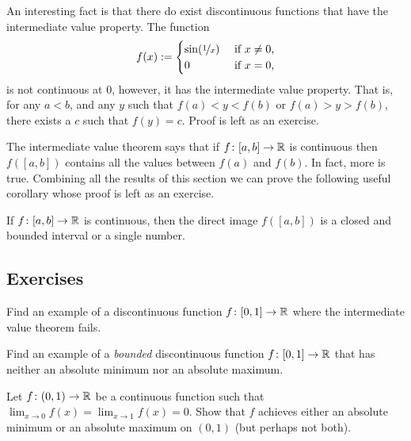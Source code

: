 \begin{example}
An interesting fact is that there do exist discontinuous functions that have
the intermediate value property.
The function
\begin{equation*}
f(x) :=
\begin{cases}
\sin(\nicefrac{1}{x}) & \text{ if $x \not= 0$,} \\
0 & \text{ if $x=0$,}
\end{cases}
\end{equation*}
is not continuous at 0, however, it has the intermediate value property.
That is, for any $a < b$, and any $y$ such that $f(a) < y < f(b)$
or $f(a) > y > f(b)$,
there exists a $c$ such that $f(y) = c$.
Proof is left as an exercise.
\end{example}

The intermediate value theorem says that if $f \colon [a,b] \to {\mathbb{R}}$ is
continuous then $f([a,b])$ contains all the values between $f(a)$ and
$f(b)$.  In fact, more is true.  Combining all the results of this section
we can prove the following useful corollary whose proof is left as an exercise.

\begin{cor} \label{cor:imageofinterval}
If $f \colon [a,b] \to {\mathbb{R}}$ is continuous, then the direct image $f([a,b])$
is a closed and bounded interval or a single number.
\end{cor}

\subsection{Exercises}

\begin{exercise}
Find an example of a discontinuous function $f \colon [0,1] \to {\mathbb{R}}$
where the intermediate value theorem fails.
\end{exercise}

\begin{exercise}
Find an example of a \emph{bounded} discontinuous function $f \colon [0,1]
\to {\mathbb{R}}$ that has neither an absolute minimum nor an absolute maximum.
\end{exercise}

\begin{exercise}
Let $f \colon (0,1) \to {\mathbb{R}}$ be a continuous function such that
$\displaystyle \lim_{x\to 0} f(x) =
\displaystyle \lim_{x\to 1} f(x) = 0$.  Show that
$f$ achieves either an absolute minimum or an absolute maximum on $(0,1)$
(but perhaps not both).
\end{exercise}

